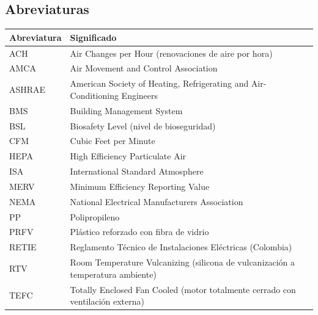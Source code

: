 \subsection*{Abreviaturas}
\begin{tabularx}{\textwidth}{@{}lX@{}}
	\toprule
	\textbf{Abreviatura} & \textbf{Significado} \\
	\midrule
	ACH & Air Changes per Hour (renovaciones de aire por hora) \\
	AMCA & Air Movement and Control Association \\
	ASHRAE & American Society of Heating, Refrigerating and Air-Conditioning Engineers \\
	BMS & Building Management System \\
	BSL & Biosafety Level (nivel de bioseguridad) \\
	CFM & Cubic Feet per Minute \\
	HEPA & High Efficiency Particulate Air \\
	ISA & International Standard Atmosphere \\
	MERV & Minimum Efficiency Reporting Value \\
	NEMA & National Electrical Manufacturers Association \\
	PP & Polipropileno \\
	PRFV & Plástico reforzado con fibra de vidrio \\
	RETIE & Reglamento Técnico de Instalaciones Eléctricas (Colombia) \\
	RTV & Room Temperature Vulcanizing (silicona de vulcanización a temperatura ambiente) \\
	TEFC & Totally Enclosed Fan Cooled (motor totalmente cerrado con ventilación externa) \\
	\bottomrule
\end{tabularx}

\newpage
